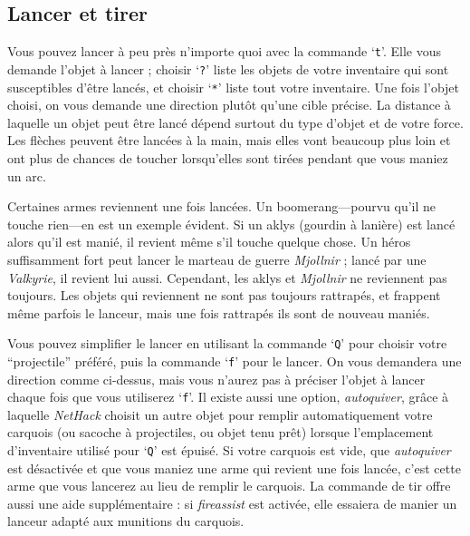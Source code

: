 \documentclass[titlepage]{article}
\begin{document}
\subsection*{Lancer et tirer}

Vous pouvez lancer à peu près n'importe quoi avec la commande `\texttt{t}'.  Elle vous
demande l'objet à lancer ; choisir `\texttt{?}' liste les objets de votre inventaire
qui sont susceptibles d'être lancés, et choisir `\texttt{*}' liste
tout votre inventaire.  Une fois l'objet choisi, on vous
demande une direction plutôt qu'une cible précise.  La
distance à laquelle un objet peut être lancé dépend surtout du type d'objet
et de votre force.  Les flèches peuvent être lancées à la main, mais elles vont
beaucoup plus loin et ont plus de chances de toucher lorsqu'elles sont tirées
pendant que vous maniez un arc.

Certaines armes reviennent une fois lancées.
Un boomerang---pourvu qu'il ne touche rien---en est un exemple évident.
Si un aklys (gourdin à lanière) est lancé alors qu'il est manié, il revient
même s'il touche quelque chose.
Un héros suffisamment fort peut lancer le marteau de guerre \textit{Mjollnir} ;
lancé par une \textit{Valkyrie}, il revient lui aussi.
Cependant, les aklys et \textit{Mjollnir} ne reviennent pas toujours.
Les objets qui reviennent ne sont pas toujours rattrapés, et frappent même parfois
le lanceur, mais une fois rattrapés ils sont de nouveau maniés.

Vous pouvez simplifier le lancer en utilisant la commande `\texttt{Q}' pour
choisir votre ``projectile'' préféré, puis la commande `\texttt{f}' pour
le lancer.  On vous demandera une direction comme ci-dessus, mais vous n'aurez pas
à préciser l'objet à lancer chaque fois que vous utiliserez `\texttt{f}'.  Il existe
aussi une option,
\textit{autoquiver},
grâce à laquelle \textit{NetHack} choisit un autre objet pour remplir automatiquement votre
carquois (ou sacoche à projectiles, ou objet tenu prêt) lorsque l'emplacement
d'inventaire utilisé pour `\texttt{Q}' est épuisé.
Si votre carquois est vide, que \textit{autoquiver}
est désactivée et que vous maniez une arme qui revient une fois lancée,
c'est cette arme que vous lancerez au lieu de remplir le carquois.
La commande de tir offre aussi une aide supplémentaire : si \textit{fireassist}
est activée, elle essaiera de manier un lanceur adapté aux munitions du carquois.
\end{document}
